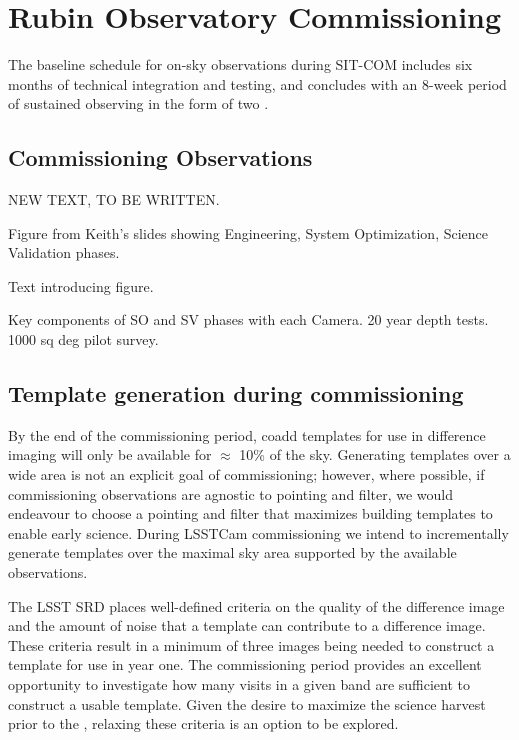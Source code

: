 \section{Rubin Observatory Commissioning}
\label{sec:commissioning}

The baseline schedule for on-sky observations during SIT-COM includes six months of technical integration and testing, and concludes with an 8-week period of sustained observing in the form of two \svs \citep{SCTN-007}.

\subsection{Commissioning Observations}

NEW TEXT, TO BE WRITTEN.

Figure from Keith's slides showing Engineering, System Optimization, Science Validation phases.

Text introducing figure.

Key components of SO and SV phases with each Camera. 20 year depth tests. 1000 sq deg pilot survey. 


\subsection{Template generation during commissioning}

By the end of the commissioning period, coadd templates for use in difference imaging will only be available for $\approx$ 10\% of the sky.
Generating templates over a wide area is not an explicit goal of commissioning;  however, where possible, if commissioning observations are agnostic to pointing and filter, we would endeavour to choose a pointing and filter that maximizes building templates to enable early science.
During LSSTCam commissioning we intend to incrementally generate templates over the maximal sky area supported by the available observations.

The LSST SRD places well-defined criteria on the quality of the difference image and the amount of noise that a template can contribute to a difference image.
These criteria result in a minimum of three images being needed to construct a template for use in year one.
The commissioning period provides an excellent opportunity to investigate how many visits in a given band are sufficient to construct a usable template.
Given the desire to maximize the science harvest prior to the \drone,  relaxing these criteria is an option to be explored.


